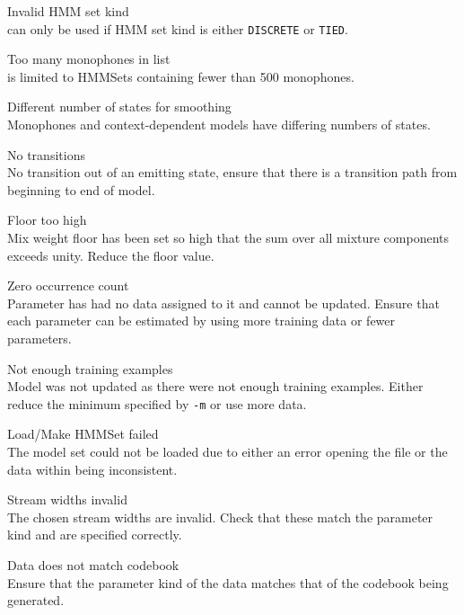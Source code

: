 \begin{itemize}
\begin{itemize}
    Invalid HMM set kind\\
         can only be used if HMM set kind is either
        \texttt{DISCRETE} or \texttt{TIED}.

    Too many monophones in list\\
         is limited to HMMSets containing fewer than
        500 monophones.

    Different number of states for smoothing\\
        Monophones and context-dependent models have differing
        numbers of states.

    No transitions\\
        No transition out of an emitting state, ensure that
        there is a transition path from beginning to end of model.

    Floor too high\\
        Mix weight floor has been set so high that the sum over all 
        mixture components exceeds unity.  Reduce the floor value.

    Zero occurrence count\\
        Parameter has had no data assigned to it and cannot be
        updated.  Ensure that each parameter can be estimated by
        using more training data or fewer parameters.

    Not enough training examples\\
        Model was not updated as there were not enough training examples.
        Either reduce the minimum specified by \texttt{-m} or
        use more data.

    Load/Make HMMSet failed\\
        The model set could not be loaded due to either an error opening the
        file or the data within being inconsistent.

\end{itemize}


\begin{itemize}
    Stream widths invalid\\
        The chosen stream widths are invalid.  Check that these match the 
        parameter kind and are specified correctly.

    Data does not match codebook\\
        Ensure that the parameter kind of the data matches that of the codebook
        being generated.


\end{itemize}
\end{itemize}
